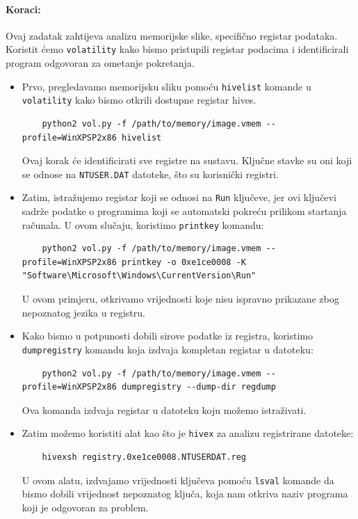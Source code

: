 \documentclass{article}
\begin{document}
\paragraph{Koraci:}

Ovaj zadatak zahtijeva analizu memorijske slike, specifično registar podataka. Koristit ćemo \texttt{volatility} kako bismo pristupili registar podacima i identificirali program odgovoran za ometanje pokretanja.

\begin{itemize}
    \item Prvo, pregledavamo memorijsku sliku pomoću \texttt{hivelist} komande u \texttt{volatility} kako bismo otkrili dostupne registar hives.
    \begin{verbatim}
    python2 vol.py -f /path/to/memory/image.vmem --profile=WinXPSP2x86 hivelist
    \end{verbatim}
    Ovaj korak će identificirati sve registre na sustavu. Ključne stavke su oni koji se odnose na \texttt{NTUSER.DAT} datoteke, što su korisnički registri.

    \item Zatim, istražujemo registar koji se odnosi na \texttt{Run} ključeve, jer ovi ključevi sadrže podatke o programima koji se automatski pokreću prilikom startanja računala. U ovom slučaju, koristimo \texttt{printkey} komandu:
    \begin{verbatim}
    python2 vol.py -f /path/to/memory/image.vmem --profile=WinXPSP2x86 printkey -o 0xe1ce0008 -K "Software\Microsoft\Windows\CurrentVersion\Run"
    \end{verbatim}
    U ovom primjeru, otkrivamo vrijednosti koje nisu ispravno prikazane zbog nepoznatog jezika u registru.

    \item Kako bismo u potpunosti dobili sirove podatke iz registra, koristimo \texttt{dumpregistry} komandu koja izdvaja kompletan registar u datoteku:
    \begin{verbatim}
    python2 vol.py -f /path/to/memory/image.vmem --profile=WinXPSP2x86 dumpregistry --dump-dir regdump
    \end{verbatim}
    Ova komanda izdvaja registar u datoteku koju možemo istraživati.

    \item Zatim možemo koristiti alat kao što je \texttt{hivex} za analizu registrirane datoteke:
    \begin{verbatim}
    hivexsh registry.0xe1ce0008.NTUSERDAT.reg
    \end{verbatim}
    U ovom alatu, izdvajamo vrijednosti ključeva pomoću \texttt{lsval} komande da bismo dobili vrijednost nepoznatog ključa, koja nam otkriva naziv programa koji je odgovoran za problem.

\end{itemize}
\end{document}
